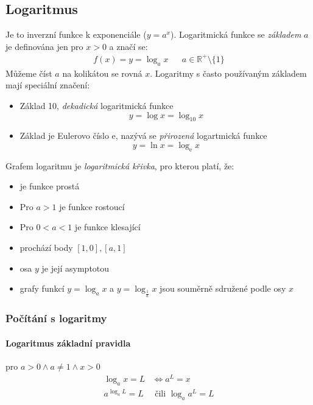 \documentclass[12pt]{article}
\newcommand{\euler}{\mathrm{e}} %
\newcommand{\nR}{\mathbb{R}} %
\begin{document}
\subsection{Logaritmus}
Je to inverzní funkce k exponenciále ($y = a^x$). Logaritmická funkce se \emph{základem} $a$ je definována jen pro $x>0$ a značí se:
\begin{align}
f(x) =y = \log_a x && a \in \nR^+ \setminus \{ 1 \}
\end{align}
Můžeme číst $a$ na kolikátou se rovná $x$. Logaritmy s často používaným základem mají speciální značení:
\begin{itemize}
\item Základ 10, \emph{dekadická} logaritmická funkce
\begin{equation}
y = \log x = \log_10 x
\end{equation}
\item Základ je Eulerovo číslo $\euler$, nazývá se \emph{přirozená} logartmická funkce
\begin{equation}
y = \ln x = \log_{\euler} x
\end{equation}
\end{itemize}
Grafem logaritmu je \emph{logaritmická křivka}, pro kterou platí, že:
\begin{itemize}
\item je funkce prostá
\item Pro $a>1$ je funkce rostoucí
\item Pro $0<a<1$ je funkce klesající
\item prochází body $[1,0],[a,1]$
\item osa $y$ je její asymptotou
\item grafy funkcí $y = \log_a x$ a $y = \log_{\frac{1}{a}} x$ jsou souměrně sdružené podle osy $x$
\end{itemize}
\subsubsection{Počítání s logaritmy}
\paragraph{Logaritmus základní pravidla} pro $a>0 \land a \neq 1 \land x>0$
\begin{align}
\log_a x = L &\iff  a^L = x\\
a^{\log_a L} = L &\text{	čili	} \log_a a^L = L
\end{align}
\end{document}
